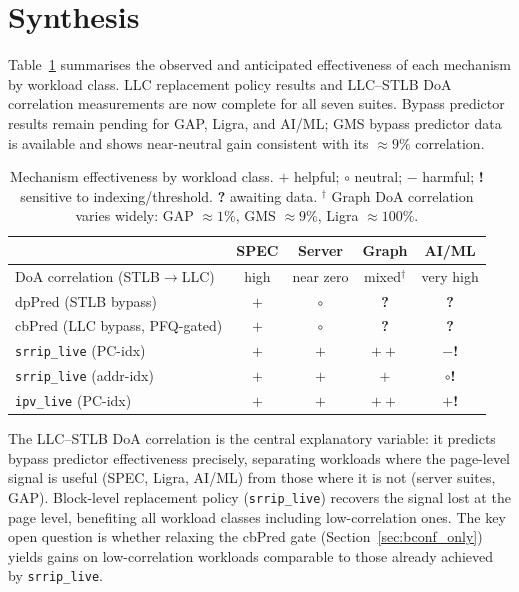 \documentclass[12pt]{article}
\begin{document}
\section{Synthesis}
\label{sec:synthesis}

Table~\ref{tab:mechanism_fit} summarises the observed and anticipated
effectiveness of each mechanism by workload class.
LLC replacement policy results and LLC--STLB DoA correlation measurements
are now complete for all seven suites.
Bypass predictor results remain pending for GAP, Ligra, and AI/ML;
GMS bypass predictor data is available and shows near-neutral gain
consistent with its $\approx9\%$ correlation.

\begin{table}[htbp]
  \centering
  \caption{Mechanism effectiveness by workload class.
           $+$ helpful; $\circ$ neutral; $-$ harmful;
           \textbf{!} sensitive to indexing/threshold.
           \textbf{?} awaiting data.
           $^\dagger$ Graph DoA correlation varies widely:
           GAP $\approx1\%$, GMS $\approx9\%$, Ligra $\approx100\%$.}
  \label{tab:mechanism_fit}
  \begin{tabular}{lcccc}
    \toprule
                                    & SPEC        & Server      & Graph       & AI/ML       \\
    \midrule
    DoA correlation (STLB$\to$LLC)  & high        & near zero   & mixed$^\dagger$ & very high   \\
    \midrule
    dpPred (STLB bypass)            & $+$         & $\circ$     & \textbf{?}  & \textbf{?}  \\
    cbPred (LLC bypass, PFQ-gated)  & $+$         & $\circ$     & \textbf{?}  & \textbf{?}  \\
    \texttt{srrip\_live} (PC-idx)   & $+$         & $+$         & $++$        & $-$\textbf{!} \\
    \texttt{srrip\_live} (addr-idx) & $+$         & $+$         & $+$         & $\circ$\textbf{!} \\
    \texttt{ipv\_live} (PC-idx)     & $+$         & $+$         & $++$        & $+$\textbf{!} \\
    \bottomrule
  \end{tabular}
\end{table}

The LLC--STLB DoA correlation is the central explanatory variable: it
predicts bypass predictor effectiveness precisely, separating workloads
where the page-level signal is useful (SPEC, Ligra, AI/ML) from those
where it is not (server suites, GAP).
Block-level replacement policy (\texttt{srrip\_live}) recovers the signal
lost at the page level, benefiting all workload classes including
low-correlation ones.
The key open question is whether relaxing the cbPred gate
(Section~\ref{sec:bconf_only}) yields gains on low-correlation workloads
comparable to those already achieved by \texttt{srrip\_live}.
\end{document}
